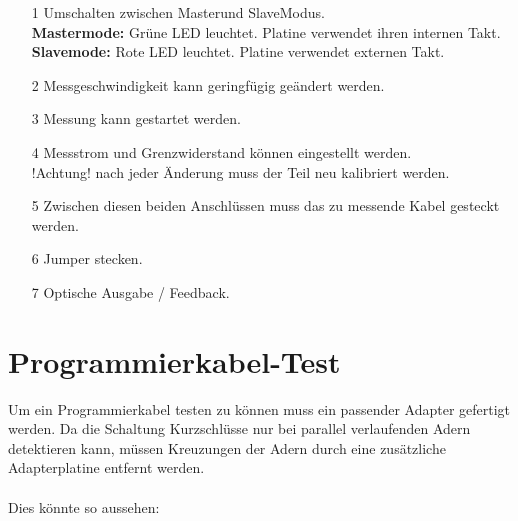 \documentclass[a4paper,11pt]{scrartcl}
\begin{document}
\begin{itemize}
	\item[1] Umschalten zwischen \glqq Master\grqq und \glqq Slave\grqq Modus.\\
				\textbf{Mastermode:} Grüne LED leuchtet. Platine verwendet ihren internen Takt.\\
				\textbf{Slavemode:} Rote LED leuchtet. Platine verwendet externen Takt.
				
	\item[2] Messgeschwindigkeit kann geringfügig geändert werden.
	
	\item[3] Messung kann gestartet werden.
	
	\item[4] Messstrom und Grenzwiderstand können eingestellt werden.\\
	 			!Achtung! nach jeder Änderung muss der Teil neu kalibriert werden.
	 			
	\item[5] Zwischen diesen beiden Anschlüssen muss das zu messende Kabel gesteckt werden.
	
	\item[6] Jumper stecken.
	
	\item[7] Optische Ausgabe / Feedback.
\end{itemize}

\newpage

\section{Programmierkabel-Test}

Um ein Programmierkabel testen zu können muss ein passender Adapter gefertigt werden. Da die Schaltung Kurzschlüsse nur bei parallel verlaufenden Adern detektieren kann, müssen Kreuzungen der Adern durch eine zusätzliche Adapterplatine entfernt werden. 
\\
\\
Dies könnte so aussehen:
\end{document}
